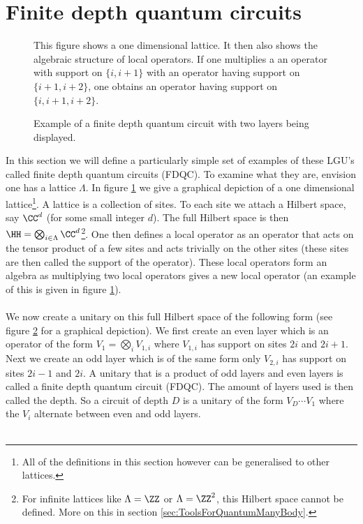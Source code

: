 \section{Finite depth quantum circuits}\label{sec:finite-depth-quantum-circuits}
\begin{figure}
	\centering
	
	\caption{This figure shows a one dimensional lattice. It then also shows the algebraic structure of local operators. If one multiplies a an operator with support on $\{i,i+1\}$ with an operator having support on $\{i+1,i+2\}$, one obtains an operator having support on $\{i,i+1,i+2\}$.}
	\label{fig:Lattice}
\end{figure}
\begin{figure}
	\centering
	
	\caption{Example of a finite depth quantum circuit with two layers being displayed.}
	\label{fig:FiniteDepthQuantumCirquit}
\end{figure}
In this section we will define a particularly simple set of examples of these LGU's called finite depth quantum circuits (FDQC). To examine what they are, envision one has a lattice $\Lambda$. In figure \ref{fig:Lattice} we give a graphical depiction of a one dimensional lattice\footnote{All of the definitions in this section however can be generalised to other lattices.}. A lattice is a collection of sites. To each site we attach a Hilbert space, say $\CC^d$ (for some small integer $d$). The full Hilbert space is then $\HH=\bigotimes_{i\in\Lambda}\CC^d$\footnote{For infinite lattices like $\Lambda=\ZZ$ or $\Lambda=\ZZ^2$, this Hilbert space cannot be defined. More on this in section \ref{sec:ToolsForQuantumManyBody}.}. One then defines a local operator as an operator that acts on the tensor product of a few sites and acts trivially on the other sites (these sites are then called the support of the operator). These local operators form an algebra as multiplying two local operators gives a new local operator (an example of this is given in figure \ref{fig:Lattice}).\\\\
We now create a unitary on this full Hilbert space of the following form (see figure \ref{fig:FiniteDepthQuantumCirquit} for a graphical depiction). We first create an even layer which is an operator of the form $V_1=\bigotimes_{i}V_{1,i}$ where $V_{1,i}$ has support on sites $2i$ and $2i+1$. Next we create an odd layer which is of the same form only $V_{2,i}$ has support on sites $2i-1$ and $2i$. A unitary that is a product of odd layers and even layers is called a finite depth quantum circuit (FDQC). The amount of layers used is then called the depth. So a circuit of depth $D$ is a unitary of the form $V_D\cdots V_1$ where the $V_i$ alternate between even and odd layers.\\\\
